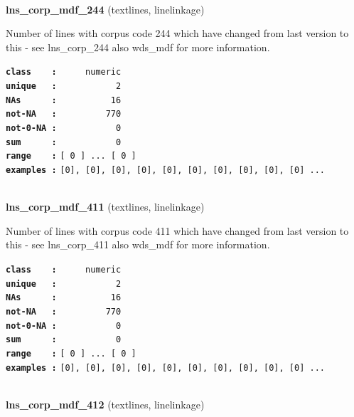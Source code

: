 \documentclass[]{article}
\begin{document}
~

\textbf{lns\_corp\_mdf\_244} (textlines, linelinkage)

Number of lines with corpus code 244 which have changed from last
version to this - see lns\_corp\_244 also wds\_mdf for more information.

\textbf{\texttt{class\ \ \ \ :}} \texttt{~~~~~numeric}\\
\textbf{\texttt{unique\ \ \ :}} \texttt{~~~~~~~~~~~2}\\
\textbf{\texttt{NAs\ \ \ \ \ \ :}} \texttt{~~~~~~~~~~16}\\
\textbf{\texttt{not-NA\ \ \ :}} \texttt{~~~~~~~~~770}\\
\textbf{\texttt{not-0-NA\ :}} \texttt{~~~~~~~~~~~0}\\
\textbf{\texttt{sum\ \ \ \ \ \ :}} \texttt{~~~~~~~~~~~0}\\
\textbf{\texttt{range\ \ \ \ :}}
\texttt{{[}\ 0\ {]}\ ...\ {[}\ 0\ {]}}\\
\textbf{\texttt{examples\ :}}
\texttt{{[}0{]},\ {[}0{]},\ {[}0{]},\ {[}0{]},\ {[}0{]},\ {[}0{]},\ {[}0{]},\ {[}0{]},\ {[}0{]},\ {[}0{]}\ ...}\\

~

\textbf{lns\_corp\_mdf\_411} (textlines, linelinkage)

Number of lines with corpus code 411 which have changed from last
version to this - see lns\_corp\_411 also wds\_mdf for more information.

\textbf{\texttt{class\ \ \ \ :}} \texttt{~~~~~numeric}\\
\textbf{\texttt{unique\ \ \ :}} \texttt{~~~~~~~~~~~2}\\
\textbf{\texttt{NAs\ \ \ \ \ \ :}} \texttt{~~~~~~~~~~16}\\
\textbf{\texttt{not-NA\ \ \ :}} \texttt{~~~~~~~~~770}\\
\textbf{\texttt{not-0-NA\ :}} \texttt{~~~~~~~~~~~0}\\
\textbf{\texttt{sum\ \ \ \ \ \ :}} \texttt{~~~~~~~~~~~0}\\
\textbf{\texttt{range\ \ \ \ :}}
\texttt{{[}\ 0\ {]}\ ...\ {[}\ 0\ {]}}\\
\textbf{\texttt{examples\ :}}
\texttt{{[}0{]},\ {[}0{]},\ {[}0{]},\ {[}0{]},\ {[}0{]},\ {[}0{]},\ {[}0{]},\ {[}0{]},\ {[}0{]},\ {[}0{]}\ ...}\\

~

\textbf{lns\_corp\_mdf\_412} (textlines, linelinkage)
\end{document}
